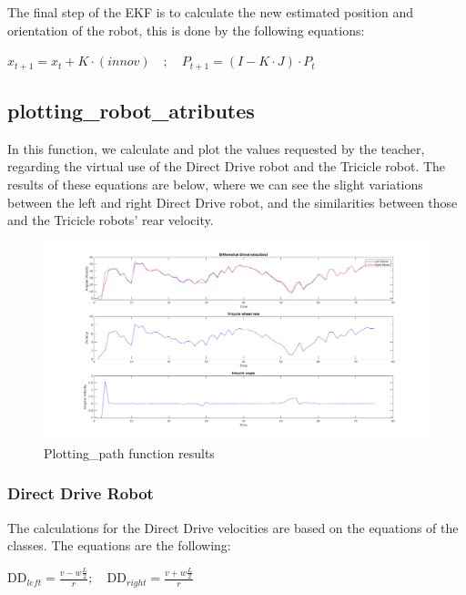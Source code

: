 \documentclass[runningheads]{llncs}
\begin{document}
The final step of the EKF is to calculate the new estimated position and orientation of the robot, this is done by the following equations:
\\ 
\begin{center}
\begin{math}
    x_{t+1}=x_t+K\cdot(innov) \quad ; \quad P_{t+1}=(I-K\cdot J)\cdot P_t
\end{math}
\end{center}

\subsection*{plotting\_robot\_atributes}
In this function, we calculate and plot the values requested by the teacher, regarding the virtual use of the Direct Drive robot and the Tricicle robot. 
The results of these equations are below, where we can see the slight variations between the left and right Direct Drive robot, and the similarities between those and the Tricicle robots' rear velocity.

\begin{figure}
    \centering
    \includegraphics[width=\textwidth]{plotting_robot_vels.png}
    \caption{Plotting\_path function results}
    \label{plotting_robot_fig}
\end{figure}




\subsubsection*{Direct Drive Robot}
The calculations for the Direct Drive velocities are based on the equations of the classes. The equations are the following:
\\
\begin{center}
    
    \begin{math}
        \text{DD}_{left} = \frac{v - w\frac{L}{2}} {r}; \quad
        \text{DD}_{right} = \frac{v + w\frac{L}{2}} {r}
    \end{math}
\end{center}
\end{document}
